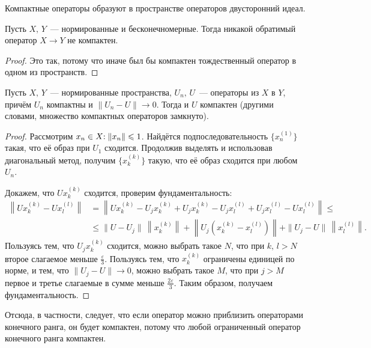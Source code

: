 \documentclass{notes}
\begin{document}
	\begin{rem}
		Компактные операторы образуют в пространстве операторов двусторонний идеал.
	\end{rem}

	\begin{cor}
		Пусть $X, \, Y$~--- нормированные и бесконечномерные. Тогда никакой обратимый оператор $X \to Y$ не компактен.
		\begin{proof}
			Это так, потому что иначе был бы компактен тождественный оператор в одном из пространств.
		\end{proof}
	\end{cor}

	\begin{thm}
		Пусть $X, \, Y$~--- нормированные пространства, $U_n, \, U$~--- операторы из $X$ в $Y$, причём $U_n$ компактны и $\|U_n - U\| \to 0$. Тогда и $U$ компактен (другими словами, множество компактных операторов замкнуто).
		\begin{proof}
			Рассмотрим $x_n \in X\text{\text{:}} \; \|x_n\| \leqslant 1$. Найдётся подпоследовательность $\{x_n^{(1)}\}$ такая, что её образ при $U_1$ сходится. Продолжив выделять и использовав диагональный метод, получим $\{x_k^{(k)}\}$ такую, что её образ сходится при любом $U_n$.

			Докажем, что $Ux_k^{(k)}$ сходится, проверим фундаментальность:
			\begin{align*}
				\left\|U x_k^{(k)} - U x_l^{(l)}\right\| &= \left\|U x_k^{(k)} - U_j x_k^{(k)} + U_j x_k^{(k)} - U_j x_l^{(l)}  + U_j x_l^{(l)} - U x_l^{(l)}\right\| \leqslant \\ &\leqslant \|U - U_j\| \, \left\|x_k^{(k)}\right\| + \left\|U_j\left(x_k^{(k)} - x_l^{(l)}\right)\right\| + \|U_j - U\| \, \left\|x_l^{(l)}\right\|.
			\end{align*}
			Пользуясь тем, что $U_j x_k^{(k)}$ сходится, можно выбрать такое $N$, что при $k, \, l > N$ второе слагаемое меньше $\tfrac{\varepsilon}{3}$. Пользуясь тем, что $x_k^{(k)}$ ограничены единицей по норме, и тем, что $\|U_j - U\| \to 0$, можно выбрать такое $M$, что при $j > M$ первое и третье слагаемые в сумме меньше $\tfrac{2 \varepsilon}{3}$. Таким образом, получаем фундаментальность. 
		\end{proof}
	\end{thm}

	\begin{cor}
		Отсюда, в частности, следует, что если оператор можно приблизить операторами конечного ранга, он будет компактен, потому что любой ограниченный оператор конечного ранга компактен.
	\end{cor}
\end{document}
